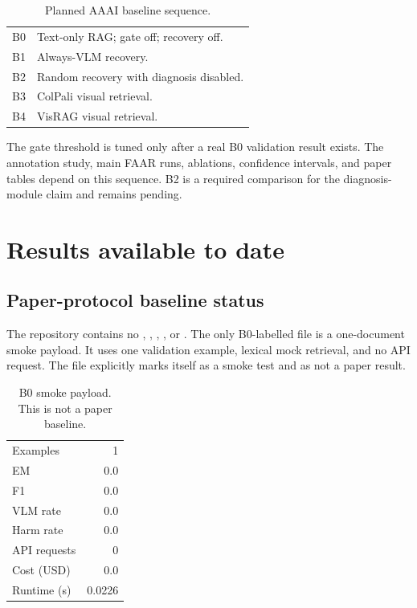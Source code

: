 \documentclass[10pt,twocolumn]{article}
\begin{document}
\begin{table}[H]
\centering
\caption{Planned AAAI baseline sequence.}
\label{tab:baselines}
\small
\begin{tabularx}{\columnwidth}{@{}lY@{}}
\toprule
B0 & Text-only RAG; gate off; recovery off. \\
B1 & Always-VLM recovery. \\
B2 & Random recovery with diagnosis disabled. \\
B3 & ColPali visual retrieval. \\
B4 & VisRAG visual retrieval. \\
\bottomrule
\end{tabularx}
\end{table}

The gate threshold is tuned only after a real B0 validation result exists. The annotation study, main FAAR runs, ablations, confidence intervals, and paper tables depend on this sequence. B2 is a required comparison for the diagnosis-module claim and remains pending.

\section{Results available to date}

\subsection{Paper-protocol baseline status}

The repository contains no , , , , or . The only B0-labelled file is a one-document smoke payload. It uses one validation example, lexical mock retrieval, and no API request. The file explicitly marks itself as a smoke test and as not a paper result.

\begin{table}[t]
\centering
\caption{B0 smoke payload. This is not a paper baseline.}
\label{tab:smoke}
\small
\begin{tabular}{@{}lr@{}}
\toprule
Examples & 1 \\
EM & 0.0 \\
F1 & 0.0 \\
VLM rate & 0.0 \\
Harm rate & 0.0 \\
API requests & 0 \\
Cost (USD) & 0.0 \\
Runtime (s) & 0.0226 \\
\bottomrule
\end{tabular}
\end{table}
\end{document}
